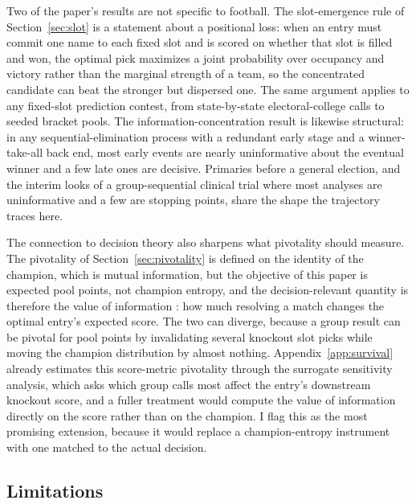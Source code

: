 \documentclass[11pt,a4paper]{article}
\begin{document}
Two of the paper's results are not specific to football. The slot-emergence rule of Section~\ref{sec:slot} is a statement about a positional loss: when an entry must commit one name to each fixed slot and is scored on whether that slot is filled and won, the optimal pick maximizes a joint probability over occupancy and victory rather than the marginal strength of a team, so the concentrated candidate can beat the stronger but dispersed one. The same argument applies to any fixed-slot prediction contest, from state-by-state electoral-college calls to seeded bracket pools. The information-concentration result is likewise structural: in any sequential-elimination process with a redundant early stage and a winner-take-all back end, most early events are nearly uninformative about the eventual winner and a few late ones are decisive. Primaries before a general election, and the interim looks of a group-sequential clinical trial where most analyses are uninformative and a few are stopping points, share the shape the trajectory traces here.

The connection to decision theory also sharpens what pivotality should measure. The pivotality of Section~\ref{sec:pivotality} is defined on the identity of the champion, which is mutual information, but the objective of this paper is expected pool points, not champion entropy, and the decision-relevant quantity is therefore the value of information \citep{howard1966, raiffa1961}: how much resolving a match changes the optimal entry's expected score. The two can diverge, because a group result can be pivotal for pool points by invalidating several knockout slot picks while moving the champion distribution by almost nothing. Appendix~\ref{app:survival} already estimates this score-metric pivotality through the surrogate sensitivity analysis, which asks which group calls most affect the entry's downstream knockout score, and a fuller treatment would compute the value of information directly on the score rather than on the champion. I flag this as the most promising extension, because it would replace a champion-entropy instrument with one matched to the actual decision.

\subsection{Limitations}
\end{document}
